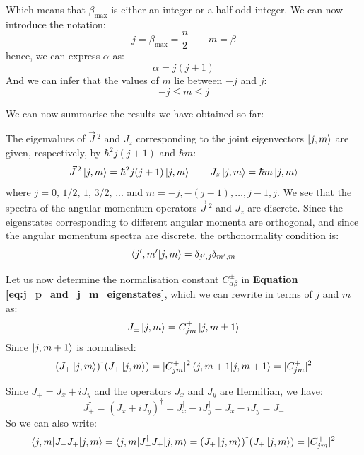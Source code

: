 Which means that $\beta_\text{max}$ is either an integer or a half-odd-integer. We can now introduce the notation:
\begin{equation}
    j = \beta_\text{max} = \frac{n}{2}\qquad m = \beta
\end{equation}
hence, we can express $\alpha$ as:
\begin{equation}
    \alpha = j(j+1)
\end{equation}
And we can infer that the values of $m$ lie between $-j$ and $j$:
\begin{equation}
    -j \leq m \leq j
\end{equation}

We can now summarise the results we have obtained so far:
\begin{definition}
    The eigenvalues of $\vec{J}\,^2$ and $J_z$ corresponding to the joint eigenvectors $\ket{j,m}$ are given, respectively, by $\hbar^2j(j+1)$ and $\hbar m$:
    \begin{equation}
        \vec{J}\,^2\ket{j,m} = \hbar^2j(j+1)\ket{j,m}\qquad J_z\ket{j,m} = \hbar m\ket{j,m}
    \end{equation}
    where $j = 0,\, 1/2,\, 1,\, 3/2,\, ...$ and $m = -j, -(j-1), \dots, j-1, j$. We see that the spectra of the angular momentum operators $\vec{J}\,^2$ and $J_z$ are discrete. Since the eigenstates corresponding to different angular momenta are orthogonal, and since the angular momentum spectra are discrete, the orthonormality condition is:
    \begin{equation}
        \braket{j',m'|j,m} = \delta_{j',j}\delta_{m',m}
    \end{equation}
\end{definition}

Let us now determine the normalisation constant $C_{\alpha\beta}^\pm$ in \textbf{Equation \ref{eq:j_p_and_j_m_eigenstates}}, which we can rewrite in terms of $j$ and $m$ as:
\begin{equation}
    J_\pm\ket{j,m} = C_{jm}^\pm\ket{j,m\pm 1}
\end{equation}
Since $\ket{j,m+1}$ is normalised:
\begin{equation}
    (J_+\ket{j,m})^\dagger (J_+\ket{j,m}) = |C_{jm}^+|^2\braket{j, m+1|j, m+1} = |C_{jm}^+|^2
\end{equation}

Since $J_+ = J_x + iJ_y$ and the operators $J_x$ and $J_y$ are Hermitian, we have:
\begin{equation}
    J_+^\dagger = (J_x+iJ_y)^\dagger = J_x^\dagger -iJ_y^\dagger = J_x - iJ_y = J_-
\end{equation}
So we can also write:
\begin{equation}
    \braket{j,m|J_-J_+|j,m} = \braket{j,m|J_+^\dagger J_+|j,m} = (J_+\ket{j,m})^\dagger (J_+\ket{j,m}) = |C_{jm}^+|^2
\end{equation}

